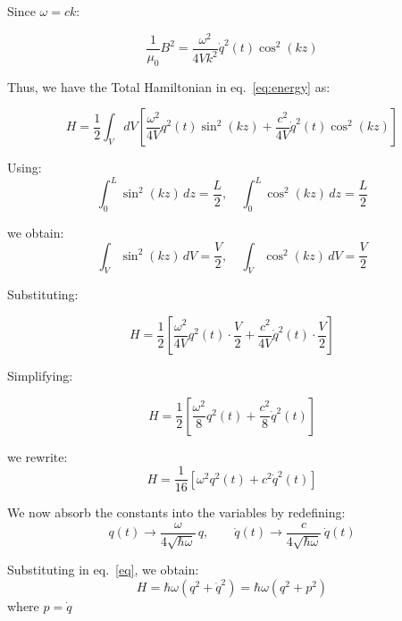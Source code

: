 Since $\omega = ck$:

\begin{equation*}
\frac{1}{\mu_0} B^2 = \frac{\omega^2}{4 V k^2} \dot{q}^2(t) \cos^2(kz)
\end{equation*}

Thus, we have the Total Hamiltonian in eq.~\eqref{eq:energy} as:

\begin{equation*}
H = \frac{1}{2} \int_V dV \left[
\frac{\omega^2}{4 V} q^2(t) \sin^2(kz)
+
\frac{c^2}{4 V} \dot{q}^2(t) \cos^2(kz)
\right]
\end{equation*}


Using:
\begin{equation*}
\int_0^L \sin^2(kz)\,dz = \frac{L}{2}, \quad
\int_0^L \cos^2(kz)\,dz = \frac{L}{2}
\end{equation*}

we obtain:
\begin{equation*}
\int_V \sin^2(kz)\, dV = \frac{V}{2}, \quad
\int_V \cos^2(kz)\, dV = \frac{V}{2}
\end{equation*}

Substituting:

\begin{equation*}
H = \frac{1}{2} \left[
\frac{\omega^2}{4 V} q^2(t) \cdot \frac{V}{2}
+
\frac{c^2}{4 V} \dot{q}^2(t) \cdot \frac{V}{2}
\right]
\end{equation*}

Simplifying:

\begin{equation*}
H = \frac{1}{2} \left[
\frac{\omega^2}{8} q^2(t)
+
\frac{c^2}{8} \dot{q}^2(t)
\right]
\end{equation*}



we rewrite:
\begin{equation}
H = \frac{1}{16} \left[ \omega^2 q^2(t) + c^2 \dot{q}^2(t) \right]
\label{eq}
\end{equation}

We now absorb the constants into the variables by redefining:
\begin{equation*}
q(t) \rightarrow \frac{\omega}{4\sqrt{\hbar\omega}}\, q,
\qquad
\dot{q}(t) \rightarrow \frac{c}{4\sqrt{\hbar\omega}}\, \dot{q}(t)
\end{equation*}

Substituting in eq.~\eqref{eq}, we obtain:
\begin{equation}
H = \hbar \omega (q^2 + \dot{q}^2) = \hbar \omega (q^2 + p^2)
\label{final_form}
\end{equation}
where $p = \dot{q}$

